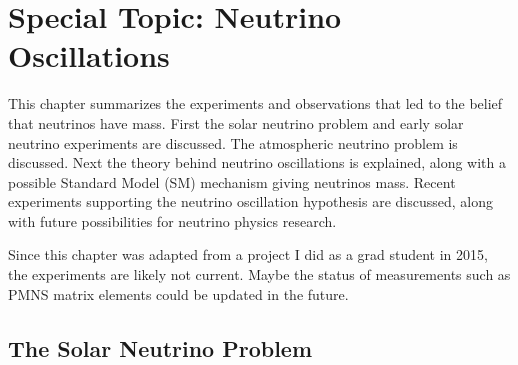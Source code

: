 \chapter{Special Topic: Neutrino Oscillations}\label{ap:spec_neutrino}

This chapter summarizes the experiments and observations that led to the belief
that neutrinos have mass. First the solar neutrino problem and early solar
neutrino experiments are discussed. The atmospheric neutrino problem is
discussed. Next the theory behind neutrino oscillations is explained, along
with a possible Standard Model (SM) mechanism giving neutrinos mass. Recent
experiments supporting the neutrino oscillation hypothesis are discussed,
along with future possibilities for neutrino physics research.

Since this chapter was adapted from a project I did as a grad student in 2015,
the experiments are likely not current. Maybe the status of measurements
such as PMNS matrix elements could be updated in the future.

\section{The Solar Neutrino Problem}

